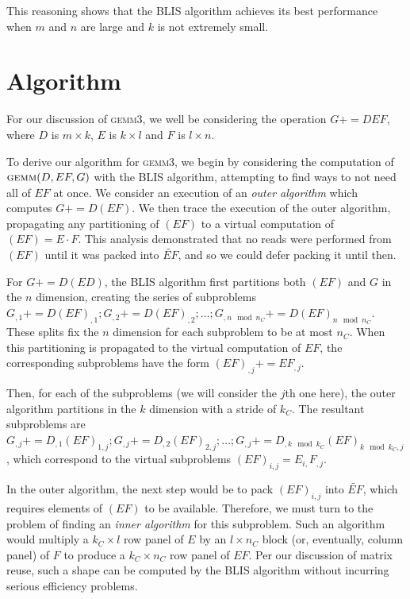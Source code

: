 \documentclass[12pt]{article}
\newcommand*{\pluseq}{\mathrel{{+}{=}}}
\newcommand*{\gemmt}{{\textsc{gemm3}}}
\begin{document}
This reasoning shows that the BLIS algorithm achieves its best performance when $m$ and $n$ are large and $k$ is not extremely small.

\section{Algorithm}
For our discussion of \gemmt{}, we well be considering the operation $G \pluseq DEF$, where $D$ is $m \times k$, $E$ is $k \times l$ and $F$ is $l \times n$.

To derive our algorithm for \gemmt{}, we begin by considering the computation of $\textsc{gemm}(D, EF, G)$ with the BLIS algorithm, attempting to find ways to not need all of $EF$ at once.
We consider an execution of an \emph{outer algorithm} which computes $G \pluseq D(EF)$.
We then trace the execution of the outer algorithm, propagating any partitioning of $(EF)$ to a virtual computation of $(EF) = E \cdot F$.
This analysis demonstrated that no reads were performed from $(EF)$ until it was packed into $\tilde{EF}$, and so we could defer packing it until then.

For $G \pluseq D(ED)$, the BLIS algorithm first partitions both $(EF)$ and $G$ in the $n$ dimension, creating the series of subproblems $G_{,1} \pluseq D(EF)_{,1}; G_{,2} \pluseq D(EF)_{,2}; \ldots; G_{,n \mod n_C} \pluseq D(EF)_{n \mod n_C}$.
These splits fix the $n$ dimension for each subproblem to be at most $n_C$.
When this partitioning is propagated to the virtual computation of $EF$, the corresponding subproblems have the form $(EF)_{,j} \pluseq EF_{,j}$.

Then, for each of the subproblems (we will consider the $j$th one here), the outer algorithm partitions in the $k$ dimension with a stride of $k_C$.
The resultant subproblems are $G_{,j} \pluseq D_{,1}(EF)_{1,j}; G_{,j} \pluseq D_{,2}(EF)_{2,j}; \ldots; G_{,j} \pluseq D_{,k \mod k_C}(EF)_{k \mod k_C,j}$, which correspond to the virtual subproblems $(EF)_{i,j} = E_{i,}F_{,j}$.

In the outer algorithm, the next step would be to pack $(EF)_{i,j}$ into $\widetilde{EF}$, which requires elements of $(EF)$ to be available.
Therefore, we must turn to the problem of finding an \emph{inner algorithm} for this subproblem.
Such an algorithm would multiply a  $k_C \times l$ row panel of $E$ by an $l \times n_C$ block (or, eventually, column panel) of $F$ to produce a $k_C \times n_C$ row panel of $EF$.
Per our discussion of matrix reuse, such a shape can be computed by the BLIS algorithm without incurring serious efficiency problems.
\end{document}
